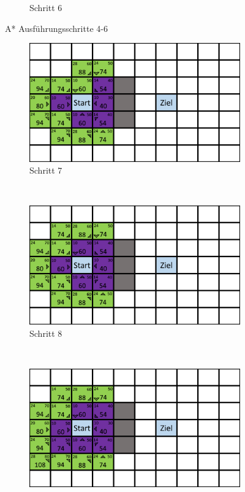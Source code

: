 \begin{figure}[H]
\begin{subfigure}[b]{0.3\textwidth}
        \caption{Schritt 6}
        \label{fig:aStartStep6}
    \end{subfigure}
    \caption{A* Ausführungsschritte 4-6}\label{fig:aStarStep4_6}
\end{figure}

\begin{figure}[H]
    \centering
    \begin{subfigure}[b]{0.3\textwidth}
        \includegraphics[width=\textwidth]{assets/aStarStep6.png}
        \caption{Schritt 7}
        \label{fig:aStartStep7}
    \end{subfigure}
    ~
    \begin{subfigure}[b]{0.3\textwidth}
        \includegraphics[width=\textwidth]{assets/aStarStep7.png}
        \caption{Schritt 8}
        \label{fig:aStartStep8}
    \end{subfigure}
    ~
    \begin{subfigure}[b]{0.3\textwidth}
        \includegraphics[width=\textwidth]{assets/aStarStep8.png}

\end{subfigure}
\end{figure}

